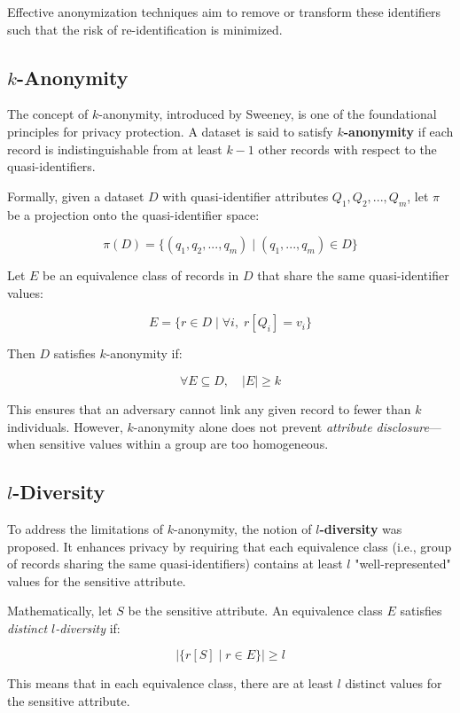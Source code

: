 \documentclass{article}
\begin{document}
Effective anonymization techniques aim to remove or transform these identifiers such that the risk of re-identification is minimized.

\subsection{$k$-Anonymity}

The concept of $k$-anonymity, introduced by Sweeney, is one of the foundational principles for privacy protection. A dataset is said to satisfy \textbf{$k$-anonymity} if each record is indistinguishable from at least $k-1$ other records with respect to the quasi-identifiers.

Formally, given a dataset $D$ with quasi-identifier attributes $Q_1, Q_2, ..., Q_m$, let $\pi$ be a projection onto the quasi-identifier space:

$$
\pi(D) = \{ (q_1, q_2, ..., q_m) \mid (q_1, ..., q_m) \in D \}
$$

Let $E$ be an equivalence class of records in $D$ that share the same quasi-identifier values:

$$
E = \{ r \in D \mid \forall i, \; r[Q_i] = v_i \}
$$

Then $D$ satisfies $k$-anonymity if:

$$
\forall E \subseteq D, \quad |E| \geq k
$$

This ensures that an adversary cannot link any given record to fewer than $k$ individuals. However, $k$-anonymity alone does not prevent \textit{attribute disclosure}—when sensitive values within a group are too homogeneous.

\subsection{$l$-Diversity}

To address the limitations of $k$-anonymity, the notion of \textbf{$l$-diversity} was proposed. It enhances privacy by requiring that each equivalence class (i.e., group of records sharing the same quasi-identifiers) contains at least $l$ "well-represented" values for the sensitive attribute.

Mathematically, let $S$ be the sensitive attribute. An equivalence class $E$ satisfies \textit{distinct $l$-diversity} if:

$$
|\{ r[S] \mid r \in E \}| \geq l
$$

This means that in each equivalence class, there are at least $l$ distinct values for the sensitive attribute.
\end{document}
